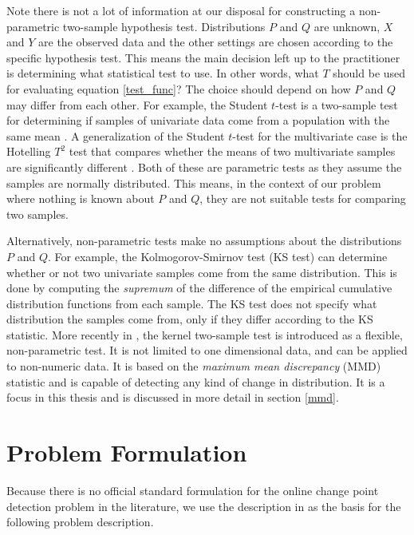 Note there is not a lot of information at our disposal for constructing a non-parametric two-sample hypothesis test. Distributions $P$ and $Q$ are unknown, $X$ and $Y$ are the observed data and the other settings are chosen according to the specific hypothesis test.  This means the main decision left up to the practitioner is determining what statistical test to use. In other words, what $T$ should be used for evaluating equation \ref{test_func}? The choice should depend on how $P$ and $Q$ may differ from each other. For example, the Student $t$-test is a two-sample test for determining if samples of univariate data come from a population with the same mean \cite{student1908probable}. A generalization of the Student $t$-test for the multivariate case is the Hotelling $T^2$ test that compares whether the means of two multivariate samples are significantly different \cite{hotelling1992generalization}. Both of these are parametric tests as they assume the samples are normally distributed. This means, in the context of our problem where nothing is known about $P$ and $Q$, they are not suitable tests for comparing two samples.

Alternatively, non-parametric tests make no assumptions about the distributions $P$ and $Q$. For example, the Kolmogorov-Smirnov test (KS test) \cite{massey1951kolmogorov} can determine whether or not two univariate samples come from the same distribution. This is done by computing the \textit{supremum} of the difference of the empirical cumulative distribution functions from each sample. The KS test does not specify what distribution the samples come from, only if they differ according to the KS statistic. More recently in \cite{gretton2012kernel} , the kernel two-sample test is introduced as a flexible, non-parametric test. It is not limited to one dimensional data, and can be applied to non-numeric data. It is based on the \textit{maximum mean discrepancy} (MMD) statistic and is capable of detecting any kind of change in distribution. It is a focus in this thesis and is discussed in more detail in section \ref{mmd}.

\section{Problem Formulation}
Because there is no official standard formulation for the online change point detection problem in the literature, we use the description in \cite{kifer2004detecting} as the basis for the following problem description. 

